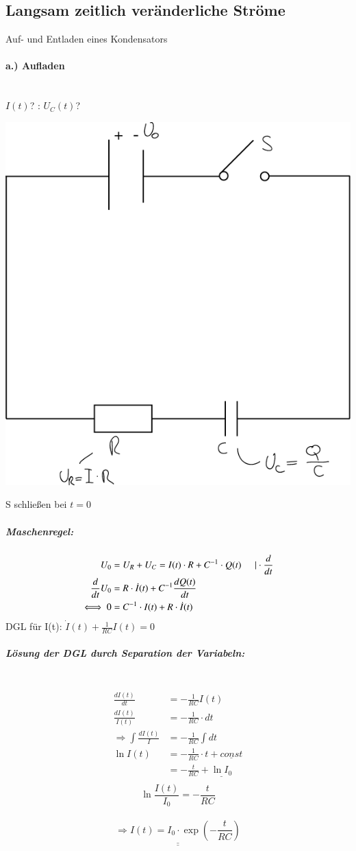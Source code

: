 \subsection{Langsam zeitlich veränderliche Ströme}

Auf- und Entladen eines Kondensators

\paragraph{a.) Aufladen} \hfill \\

$ I(t) $? : $ U_C(t) $?

\begin{center}
\includegraphics[width=0.4\linewidth]{skizzen/15/15_7/1}
\end{center}


S schließen bei $ t=0 $

	\subparagraph{Maschenregel:}
		\begin{align*}
			U_0& = U_R+U_C = I(t) \cdot R + C^{-1} \cdot Q(t)  \hspace{5mm} | \cdot \frac{d}{dt} \\
			\frac{d}{dt} U_0 &=R \cdot \dot{I}(t) + C^{-1} \frac{dQ(t)}{dt} \\
			\iff 0 &= C^{-1} \cdot I(t) + R \cdot \dot{I}(t) 
		\end{align*}
		DGL für I(t): $ \boxed{\dot{I}(t) + \frac{1}{RC} I(t) = 0} $ \\
		
	\subparagraph{Lösung der DGL durch Separation der Variabeln:}\hfill \\
		\begin{align*}
		\frac{dI(t)}{dt} &= - \frac{1}{RC} I(t)\\
		\frac{dI(t)}{I(t)} &= - \frac{1}{RC} \cdot dt \\
		\Rightarrow \int \frac{dI(t)}{I} &= - \frac{1}{RC} \int dt \\
		\ln I(t) &= - \frac{1}{RC} \cdot t + \underline{const} \\
		&= - \frac{t}{RC} + \underline{\ln I_0} \\
		\end{align*}
		$$\ln\frac{I(t)}{I_0} = -\frac{t}{RC}$$ \\ 
		$$\underline{\underline{\Rightarrow I(t) = I_0 \cdot \exp(-\frac{t}{RC})}}$$
		
